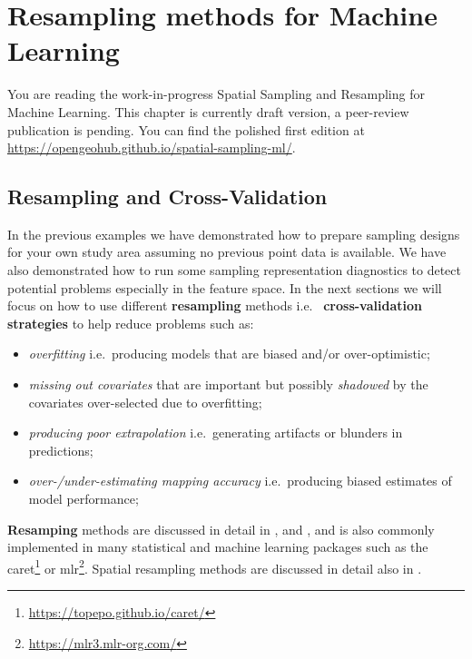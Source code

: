 \documentclass[
  graybox,natbib,nospthms]{svmono}
\providecommand{\tightlist}{%
  \setlength{\itemsep}{0pt}\setlength{\parskip}{0pt}}
\providecommand{\tightlist}{\setlength{\itemsep}{0pt}\setlength{\parskip}{0pt}}
\renewcommand{\href}[2]{#2 (\url{#1})}
\renewcommand{\href}[2]{#2\footnote{\url{#1}}}
\begin{document}
\hypertarget{resampling-methods-for-machine-learning}{%
\chapter{Resampling methods for Machine Learning}\label{resampling-methods-for-machine-learning}}

You are reading the work-in-progress Spatial Sampling and Resampling for Machine Learning. This chapter is currently draft version, a peer-review publication is pending. You can find the polished first edition at \url{https://opengeohub.github.io/spatial-sampling-ml/}.

\hypertarget{resampling-and-cross-validation}{%
\section{Resampling and Cross-Validation}\label{resampling-and-cross-validation}}

In the previous examples we have demonstrated how to prepare sampling designs
for your own study area assuming no previous point data is available. We have also
demonstrated how to run some sampling representation diagnostics to detect potential
problems especially in the feature space. In the next sections we will focus on
how to use different \textbf{resampling} methods i.e.~
\textbf{cross-validation strategies} \citep{roberts2017cross} to help reduce problems such as:

\begin{itemize}
\tightlist
\item
  \emph{overfitting} i.e.~producing models that are biased and/or over-optimistic;\\
\item
  \emph{missing out covariates} that are important but possibly \emph{shadowed} by the covariates
  over-selected due to overfitting;\\
\item
  \emph{producing poor extrapolation} i.e.~generating artifacts or blunders in predictions;\\
\item
  \emph{over-/under-estimating mapping accuracy} i.e.~producing biased estimates of model performance;
\end{itemize}

\textbf{Resamping} methods are discussed in detail in \citet{hastie2009elements}, \citet{kuhn2013applied} and
\citet{roberts2017cross}, and is also commonly implemented in many statistical and machine
learning packages such as the \href{https://topepo.github.io/caret/}{caret} or \href{https://mlr3.mlr-org.com/}{mlr}.
Spatial resampling methods are discussed in detail also in \citet{lovelace2019geocomputation}.
\end{document}
